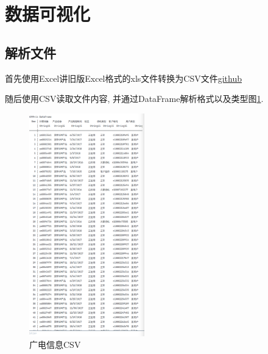\documentclass[a4paper]{article}
\begin{document}
\newpage
\section{数据可视化}\label{sub:ptx}
\subsection{解析文件} \label{sub:ptxproc}

首先使用Excel讲旧版Excel格式的xls文件转换为CSV文件\href{"https://github.com/lovebaihezi/lab/blob/main/data-process/lab1/julia/file/xian_guangdian.csv"}{github}

随后使用CSV读取文件内容, 并通过DataFrame解析格式以及类型图\ref{fig:csvinfo}. 

\begin{figure}[ht]
 \centering
 \includegraphics[width=5cm]{images/广电信息CSV展示.png}
 \caption{广电信息CSV}
 \label{fig:csvinfo}
\end{figure}
\end{document}
